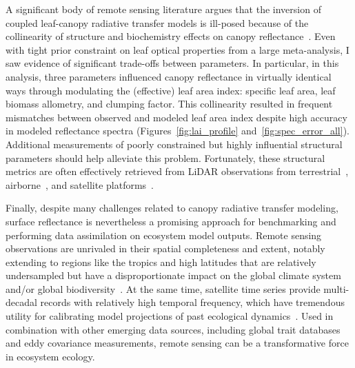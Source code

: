A significant body of remote sensing literature argues that the inversion of coupled leaf-canopy radiative transfer models is ill-posed because of the collinearity of structure and biochemistry effects on canopy reflectance~\cite[e.g.][]{combal_2003_retrieval,lewis_2007_spectral}.
Even with tight prior constraint on leaf optical properties from a large meta-analysis, I saw evidence of significant trade-offs between parameters.
In particular, in this analysis, three parameters influenced canopy reflectance in virtually identical ways through modulating the (effective) leaf area index:
specific leaf area, leaf biomass allometry, and clumping factor.
This collinearity resulted in frequent mismatches between observed and modeled leaf area index despite high accuracy in modeled reflectance spectra (Figures~\ref{fig:lai_profile} and~\ref{fig:spec_error_all}).
Additional measurements of poorly constrained but highly influential structural parameters should help alleviate this problem.
Fortunately, these structural metrics are often effectively retrieved from LiDAR observations from terrestrial~\cite{eitel_2016_beyond}, airborne~\cite{antonarakis_2014_imaging}, and satellite platforms~\cite{coyle_2015_laser}.

Finally, despite many challenges related to canopy radiative transfer modeling, surface reflectance is nevertheless a promising approach for benchmarking and performing data assimilation on ecosystem model outputs.
Remote sensing observations are unrivaled in their spatial completeness and extent, notably extending to regions like the tropics and high latitudes that are relatively undersampled but have a disproportionate impact on the global climate system~\cite{schimel2015_observing} and/or global biodiversity~\cite{jetz2016_diversity}.
At the same time, satellite time series provide multi-decadal records with relatively high temporal frequency, which have tremendous utility for calibrating model projections of past ecological dynamics~\cite{kennedy_2014_bringing,pasquarella_2016_imagery}.
Used in combination with other emerging data sources, including global trait databases and eddy covariance measurements, remote sensing can be a transformative force in ecosystem ecology.
